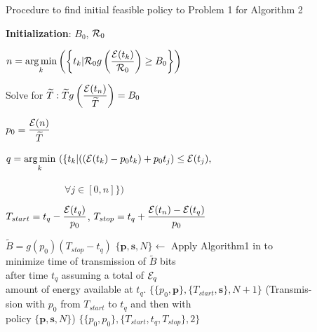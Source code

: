 
\begin{algorithm}
\caption{Procedure to find initial feasible policy to Problem 1 for Algorithm 2}
\label{init_policy}
\begin{algorithmic}[1]
\State \textbf{Initialization}: $B_0$, $\mathcal{R}_0$

\State $n=\displaystyle \operatorname*{arg\,min}_k\left(\left\{t_k | \mathcal{R}_0 g\left(\frac{\mathcal{E}(t_k)}{\mathcal{R}_0}\right)\geq B_0\right\}\right)$

\State Solve for $\widetilde{T}: \widetilde{T}g\left(\dfrac{\mathcal{E}(t_n)}{\widetilde{T}}\right) = B_0$

\State $p_0=\dfrac{\mathcal{E}(n)}{\widetilde{T}}$

\State $q=\displaystyle \operatorname*{arg\,min}_k\ ( \{ t_k | ((\mathcal{E}(t_k) - p_0t_k) + p_0t_j) \leq \mathcal{E}(t_j),$

$			 						\qquad \qquad \qquad \forall j\in[0,n]  \} )$

\State $T_{start}=t_q-\dfrac{\mathcal{E}(t_q)}{p_0}$, $T_{stop}=t_q+\dfrac{\mathcal{E}(t_n)-\mathcal{E}(t_q)}{p_0}$

	\State $\widetilde{B}=g(p_0)(T_{stop}-t_q)$  
	\State $\{\textbf{p},\textbf{s},N\}\gets$  Apply Algorithm1 in \cite{Yang} to \\	
			\hspace{26pt} minimize time of 					transmission of $\widetilde{B}$ bits\\  	
			\hspace{26pt} after time $t_q$ assuming a  total of $\mathcal{E}_{q}$\\
			\hspace{26pt} amount of energy available at $t_q$. 
	\State\Return $\{\{p_0,\textbf{p}\},\{T_{start},\textbf{s}\},N+1\}$ (Transmis-\\
	 		\hspace{26pt} sion with $p_0$ from $T_{start}$ to $t_q$ and then with\\
	 		\hspace{26pt} policy $\{\textbf{p},\textbf{s},N\}$)
\Else 
	\State\Return $\{\{p_0,p_0\},\{T_{start},t_q,T_{stop}\},2\}$ 
\EndIf
\EndProcedure
\end{algorithmic}
\end{algorithm}

